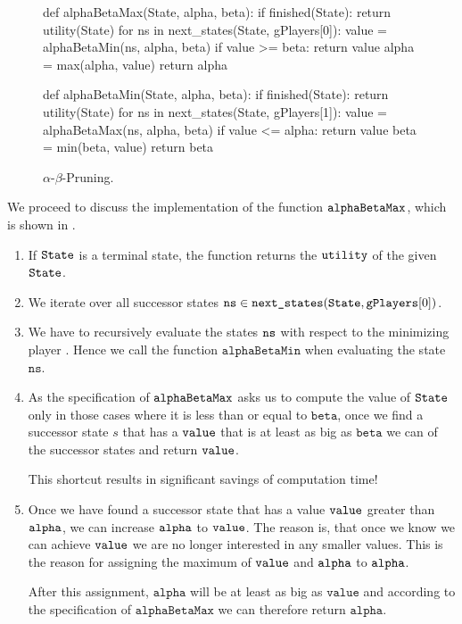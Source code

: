\begin{figure}[!ht]
\centering
\begin{python3code}
def alphaBetaMax(State, alpha, beta):
    if finished(State):
        return utility(State)
    for ns in next_states(State, gPlayers[0]):
        value = alphaBetaMin(ns, alpha, beta)
        if value >= beta:
            return value
        alpha = max(alpha, value)
    return alpha

def alphaBetaMin(State, alpha, beta):
    if finished(State):
        return utility(State)
    for ns in next_states(State, gPlayers[1]):
        value = alphaBetaMax(ns, alpha, beta)
        if value <= alpha:
            return value
        beta = min(beta, value)
    return beta
\end{python3code}
\caption{$\alpha$-$\beta$-Pruning.}
\label{fig:Alpha-Beta-Pruning.ipynb:alphaBeta}
\end{figure}
\FloatBarrier

\noindent
We proceed to discuss the implementation of the function $\texttt{alphaBetaMax}$, which is shown in
.
\begin{enumerate}
\item If $\texttt{State}$ is a terminal state, the function returns the $\texttt{utility}$ of the given
      $\texttt{State}$.
\item We iterate over all successor states $\texttt{ns} \in \texttt{next\_states}(\texttt{State}, \texttt{gPlayers}[0])$.
\item We have to recursively evaluate the states $\texttt{ns}$ with respect to the minimizing player
      .  Hence we call the function $\texttt{alphaBetaMin}$ when evaluating
      the state $\mathtt{ns}$.
\item As the specification of $\texttt{alphaBetaMax}$ asks us to compute the value of $\texttt{State}$ only in
      those cases where it is less than or equal to $\mathtt{beta}$, once we find a successor state $s$ that has a
      $\texttt{value}$ that is at least as big as $\mathtt{beta}$ we can  of the successor
      states and return $\texttt{value}$.

      This shortcut results in significant savings of computation time!
\item Once we have found a successor state that has a value $\texttt{value}$ greater than $\texttt{alpha}$,
      we can increase $\texttt{alpha}$ to $\texttt{value}$.  The reason is, that once we know we can
      achieve $\texttt{value}$ we are no longer interested in any smaller values.
      This is the reason for assigning the maximum of $\texttt{value}$ and $\texttt{alpha}$ to $\texttt{alpha}$.

      After this assignment, $\texttt{alpha}$ will be at least as big as $\texttt{value}$ and according to the specification
      of $\texttt{alphaBetaMax}$ we can therefore return $\texttt{alpha}$.
\end{enumerate}


